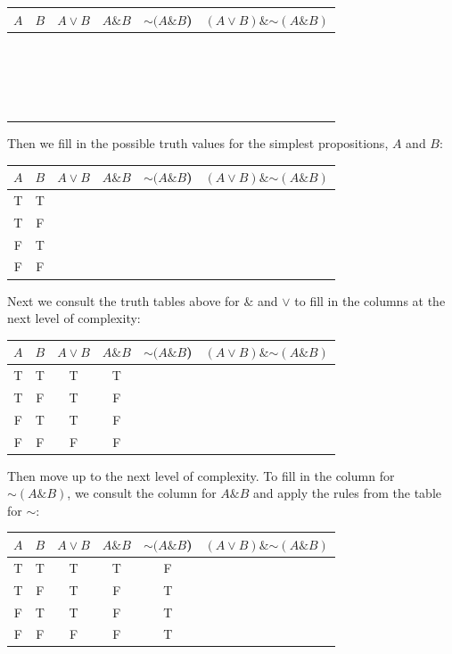 \documentclass[justified]{tufte-book}
\renewcommand{\neg}{\mathbin{\sim}}
\renewcommand{\wedge}{\mathbin{\&}}
\theoremstyle{definition}
\theoremstyle{definition}
\theoremstyle{definition}
\theoremstyle{definition}
\theoremstyle{remark}
\begin{document}
\begin{longtable}[]{@{}cccccc@{}}
\toprule
\(A\) & \(B\) & \(A \vee B\) & \(A \& B\) & \(\neg(A \wedge B\)) & \((A \vee B) \wedge \neg (A \wedge B)\) \\
\midrule
\endhead
\(\;\) & & & & & \\
\(\;\) & & & & & \\
\(\;\) & & & & & \\
\(\;\) & & & & & \\
\bottomrule
\end{longtable}

Then we fill in the possible truth values for the simplest propositions, \(A\) and \(B\):

\begin{longtable}[]{@{}cccccc@{}}
\toprule
\(A\) & \(B\) & \(A \vee B\) & \(A \& B\) & \(\neg(A \wedge B\)) & \((A \vee B) \wedge \neg (A \wedge B)\) \\
\midrule
\endhead
T & T & & & & \\
T & F & & & & \\
F & T & & & & \\
F & F & & & & \\
\bottomrule
\end{longtable}

Next we consult the truth tables above for \(\&\) and \(\vee\) to fill in the columns at the next level of complexity:

\begin{longtable}[]{@{}cccccc@{}}
\toprule
\(A\) & \(B\) & \(A \vee B\) & \(A \& B\) & \(\neg(A \wedge B\)) & \((A \vee B) \wedge \neg (A \wedge B)\) \\
\midrule
\endhead
T & T & T & T & & \\
T & F & T & F & & \\
F & T & T & F & & \\
F & F & F & F & & \\
\bottomrule
\end{longtable}

Then move up to the next level of complexity. To fill in the column for \(\neg(A \wedge B)\), we consult the column for \(A \wedge B\) and apply the rules from the table for \(\neg\):

\begin{longtable}[]{@{}cccccc@{}}
\toprule
\(A\) & \(B\) & \(A \vee B\) & \(A \& B\) & \(\neg(A \wedge B\)) & \((A \vee B) \wedge \neg (A \wedge B)\) \\
\midrule
\endhead
T & T & T & T & F & \\
T & F & T & F & T & \\
F & T & T & F & T & \\
F & F & F & F & T & \\
\bottomrule
\end{longtable}
\end{document}
